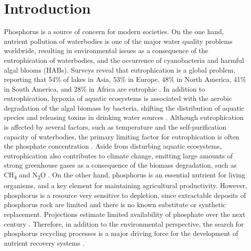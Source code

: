 \documentclass[authoryear]{elsarticle}
\begin{document}
\section{Introduction}
Phosphorus is a source of concern for modern societies. On the one hand, nutrient pollution of waterbodies is one of the major water quality problems worldwide, resulting in environmental issues as a consequence of the eutrophication of waterbodies, and the occurrence of cyanobacteria and harmful algal blooms (HABs). Surveys reveal that eutrophication is a global problem, reporting that 54\% of lakes in Asia, 53\% in Europe, 48\% in North America, 41\% in South America, and 28\% in Africa are eutrophic \citep{ansari_eutrophication_2010}. In addition to eutrophication, hypoxia of aquatic ecosystems is associated with the aerobic degradation of the algal biomass by bacteria, shifting the distribution of aquatic species and releasing toxins in drinking water sources \citep{sampat_economic_2018}. Although eutrophication is affected by several factors, such as temperature and the self-purification capacity of waterbodies, the primary limiting factor for eutrophication is often the phosphate concentration \citep{Ullmanns}. Aside from disturbing aquatic ecosystems, eutrophication also contributes to climate change, emitting large amounts of strong greenhouse gases as a consequence of the biomass degradation, such as CH\textsubscript{4} and N\textsubscript{2}O \citep{beaulieu_eutrophication_2019}. On the other hand, phosphorus is an essential nutrient for living organisms, and a key element for maintaining agricultural productivity. However, phosphorus is a resource very sensitive to depletion, since extractable deposits of phosphorus rock are limited and there is no known substitute or synthetic replacement. Projections estimate limited availability of phosphate over the next century \citep{cordell_story_2009}. Therefore, in addition to the environmental perspective, the search for phosphorus recycling processes is a major driving force for the development of nutrient recovery systems \citep{reijnders2014phosphorus}.
\end{document}
